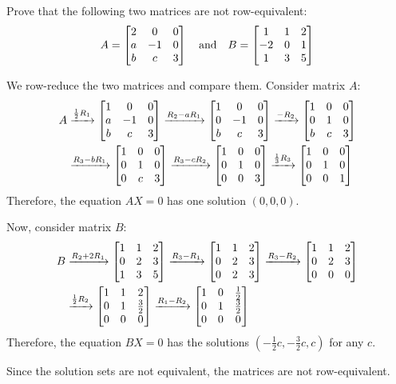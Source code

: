 \begin{xca}
  Prove that the following two matrices are not row-equivalent:
  \[ A = \m{2&0&0 \\ a&-1&0 \\ b&c&3} \qq{and} B = \m{1&1&2 \\ -2&0&1 \\ 1&3&5} \]
\end{xca}
\begin{sol}
  We row-reduce the two matrices and compare them.
  Consider matrix $A$:
  \begin{equation*}
    \begin{split}
      A & \xrightarrow{\frac12 R_1} \begin{bmatrix}1&0&0 \\ a&-1&0 \\ b&c&3\end{bmatrix}
      \xrightarrow{R_2 - aR_1} \begin{bmatrix}1&0&0 \\ 0&-1&0 \\ b&c&3\end{bmatrix}
      \xrightarrow{-R_2} \begin{bmatrix}1&0&0 \\ 0&1&0 \\ b&c&3\end{bmatrix} \\
      & \xrightarrow{R_3 - bR_1} \begin{bmatrix}1&0&0 \\ 0&1&0 \\ 0&c&3\end{bmatrix}
      \xrightarrow{R_3 - cR_2} \begin{bmatrix}1&0&0 \\ 0&1&0 \\ 0&0&3\end{bmatrix}
      \xrightarrow{\frac13 R_3} \begin{bmatrix}1&0&0 \\ 0&1&0 \\ 0&0&1\end{bmatrix}
    \end{split}
  \end{equation*}
  Therefore, the equation $AX = 0$ has one solution $(0,0,0)$.

  Now, consider matrix $B$:
  \begin{equation*}
    \begin{split}
      B & \xrightarrow{R_2 + 2R_1} \begin{bmatrix}1&1&2 \\ 0&2&3 \\ 1&3&5\end{bmatrix}
      \xrightarrow{R_3 - R_1} \begin{bmatrix}1&1&2 \\ 0&2&3 \\ 0&2&3\end{bmatrix}
      \xrightarrow{R_3 - R_2} \begin{bmatrix}1&1&2 \\ 0&2&3 \\ 0&0&0\end{bmatrix} \\
      & \xrightarrow{\frac12 R_2} \begin{bmatrix}1&1&2 \\ 0&1&\frac32 \\ 0&0&0\end{bmatrix}
      \xrightarrow{R_1 - R_2} \begin{bmatrix}1&0&\frac12 \\ 0&1&\frac32 \\ 0&0&0\end{bmatrix}
    \end{split}
  \end{equation*}
  Therefore, the equation $BX = 0$ has the solutions $(-\frac12c, -\frac32c, c)$ for any $c$.

  Since the solution sets are not equivalent, the matrices are not row-equivalent.
\end{sol}

